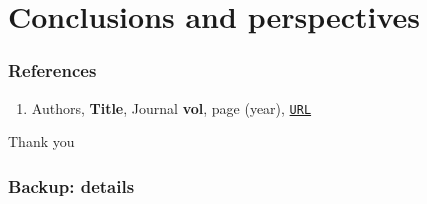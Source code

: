 \documentclass{beamer}
\begin{document}
\section{Conclusions and perspectives}

\begin{frame}
\frametitle{References}
\begin{enumerate}
\item Authors, \textbf{Title}, Journal \textbf{vol}, page (year), \href{URL}{\nolinkurl{URL}}
\end{enumerate}
\end{frame}

\begin{frame}
\centering
\Huge Thank you
\end{frame}

\appendix
\begin{frame}
\frametitle{Backup: details}
\end{frame}
\end{document}
